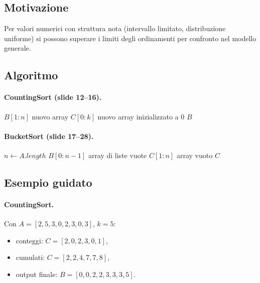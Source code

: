 \subsection{Motivazione}
Per valori numerici con struttura nota (intervallo limitato, distribuzione uniforme) si possono superare i limiti degli ordinamenti per confronto nel modello generale.

\subsection{Algoritmo}
\paragraph{CountingSort (slide 12--16).}
\begin{algorithm}[H]
	\caption{\textsc{CountingSort}$(A,k)$}
	$B[1:n]$ nuovo array\;
	$C[0:k]$ nuovo array inizializzato a 0\;
	\Return $B$\;
\end{algorithm}

\paragraph{BucketSort (slide 17--28).}
\begin{algorithm}[H]
	\caption{\textsc{BucketSort}$(A)$}
	\KwIn{$A$ array di decimali positivi in $[0,1)$}
	$n\gets A.length$\;
	$B[0:n-1]$ array di liste vuote\;
	$C[1:n]$ array vuoto\;
	\Return $C$\;
\end{algorithm}

\subsection{Esempio guidato}
\paragraph{CountingSort.}
Con $A=[2,5,3,0,2,3,0,3]$, $k=5$:
\begin{itemize}
	\item conteggi: $C=[2,0,2,3,0,1]$,
	\item cumulati: $C=[2,2,4,7,7,8]$,
	\item output finale: $B=[0,0,2,2,3,3,3,5]$.
\end{itemize}

